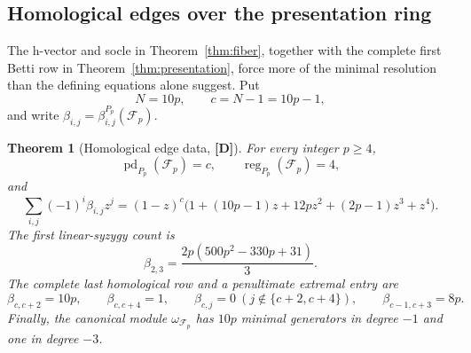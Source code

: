 \documentclass[11pt]{article}
\newtheorem{theorem}{Theorem}[section]
\theoremstyle{definition}
\theoremstyle{remark}
\begin{document}
\subsection{Homological edges over the presentation ring}

The h-vector and socle in Theorem~\ref{thm:fiber}, together with the complete first Betti row in
Theorem~\ref{thm:presentation}, force more of the minimal resolution than the defining equations
alone suggest. Put
\[
N=10p,\qquad c=N-1=10p-1,
\]
and write $\beta_{i,j}=\beta^{P_p}_{i,j}(\mathcal F_p)$.

\begin{theorem}[Homological edge data, {\bf[D]}]
\label{thm:homological-edge}
For every integer $p\ge4$,
\[
\operatorname{pd}_{P_p}(\mathcal F_p)=c,
\qquad
\operatorname{reg}_{P_p}(\mathcal F_p)=4,
\]
and
\begin{equation}
\sum_{i,j}(-1)^i\beta_{i,j}z^j
=(1-z)^c\bigl(1+(10p-1)z+12pz^2+(2p-1)z^3+z^4\bigr).
\label{eq:betti-polynomial}
\end{equation}
The first linear-syzygy count is
\begin{equation}
\beta_{2,3}=\frac{2p(500p^2-330p+31)}{3}.
\label{eq:linear-first-syzygies}
\end{equation}
The complete last homological row and a penultimate extremal entry are
\begin{equation}
\beta_{c,c+2}=10p,\qquad
\beta_{c,c+4}=1,\qquad
\beta_{c,j}=0\ (j\notin\{c+2,c+4\}),\qquad
\beta_{c-1,c+3}=8p.
\label{eq:betti-edge}
\end{equation}
Finally, the canonical module $\omega_{\mathcal F_p}$ has $10p$ minimal generators in degree
$-1$ and one in degree $-3$.
\end{theorem}
\end{document}
